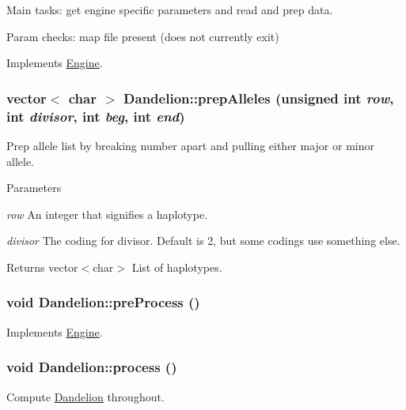 Main tasks: get engine specific parameters and read and prep data.

Param checks: map file present (does not currently exit) 

Implements \hyperlink{classEngine_aaa054d596fb8ced6e3eb4bee208f8c3d}{Engine}.

\hypertarget{classDandelion_ac02d091e91f5ffc64665e1c986a843c4}{
\subsubsection[{prepAlleles}]{\setlength{\rightskip}{0pt plus 5cm}vector$<$ char $>$ Dandelion::prepAlleles (unsigned int {\em row}, \/  int {\em divisor}, \/  int {\em beg}, \/  int {\em end})}}
\label{classDandelion_ac02d091e91f5ffc64665e1c986a843c4}
Prep allele list by breaking number apart and pulling either major or minor allele.


\begin{DoxyParams}{Parameters}
\item[{\em row}]An integer that signifies a haplotype. \item[{\em divisor}]The coding for divisor. Default is 2, but some codings use something else. \end{DoxyParams}
\begin{DoxyReturn}{Returns}
vector$<$char$>$ List of haplotypes. 
\end{DoxyReturn}
\hypertarget{classDandelion_a21fa4068a4293d3c5068d53627e49393}{
\subsubsection[{preProcess}]{\setlength{\rightskip}{0pt plus 5cm}void Dandelion::preProcess ()}}
\label{classDandelion_a21fa4068a4293d3c5068d53627e49393}


Implements \hyperlink{classEngine_aec7076b8979a13c96eceb362437dc68c}{Engine}.

\hypertarget{classDandelion_a3de169eab0899f277a3747a57c94bb0b}{
\subsubsection[{process}]{\setlength{\rightskip}{0pt plus 5cm}void Dandelion::process ()}}
\label{classDandelion_a3de169eab0899f277a3747a57c94bb0b}
Compute \hyperlink{classDandelion}{Dandelion} throughout.

